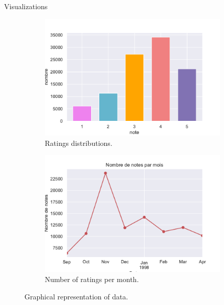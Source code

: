 \documentclass[unknownkeysallowed]{beamer}
\begin{document}
\addtocounter{framenumber}{-1}
\begin{frame}{Visualizations}
  \begin{figure}[H]
\centering
\begin{subfigure}{.5\textwidth}
  \centering
  \includegraphics[width=1\linewidth]{./images/distrib_notes.pdf}
  \caption{Ratings distributions.}
  \label{fig:distri_notes}
\end{subfigure}%
\begin{subfigure}{.5\textwidth}
  \centering
  \includegraphics[width=1\linewidth, clip,trim={0cm 0cm 0cm 0.6cm} ]{./images/notes_mois.pdf}
  \caption{Number of ratings per month.}
  \label{fig:resid_}
\end{subfigure}
\caption{Graphical representation of data.}
\label{fig:notes_mois}
\end{figure}  
\end{frame}
\end{document}
